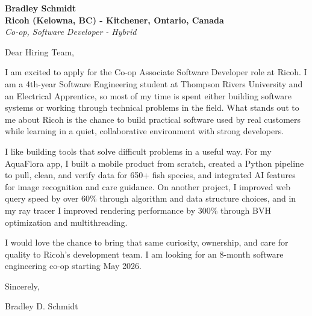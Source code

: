 \documentclass[11pt]{article}
\begin{document}
\textbf{Bradley Schmidt}\\
\vspace{0.5em}
\textbf{Ricoh (Kelowna, BC) - Kitchener, Ontario, Canada}\\
\textit{Co-op, Software Developer - Hybrid}

Dear Hiring Team,

\par

I am excited to apply for the Co-op Associate Software Developer role at Ricoh. I am a 4th-year Software Engineering student at Thompson Rivers University and an Electrical Apprentice, so most of my time is spent either building software systems or working through technical problems in the field. What stands out to me about Ricoh is the chance to build practical software used by real customers while learning in a quiet, collaborative environment with strong developers.

\par

I like building tools that solve difficult problems in a useful way. For my AquaFlora app, I built a mobile product from scratch, created a Python pipeline to pull, clean, and verify data for 650+ fish species, and integrated AI features for image recognition and care guidance. On another project, I improved web query speed by over 60\% through algorithm and data structure choices, and in my ray tracer I improved rendering performance by 300\% through BVH optimization and multithreading.

\par

I would love the chance to bring that same curiosity, ownership, and care for quality to Ricoh’s development team. I am looking for an 8-month software engineering co-op starting May 2026.

\par

Sincerely,

\par

Bradley D. Schmidt
\end{document}
